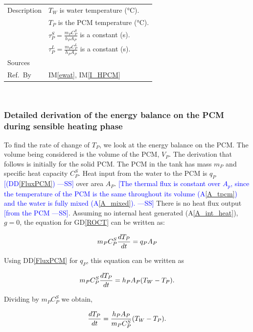 \documentclass[12pt]{article}
\newcommand{\authornote}[3]{\textcolor{#1}{[#3 ---#2]}}
\newcommand{\authornote}[3]{}
\newcommand{\wss}[1]{\authornote{blue}{SS}{#1}}
\newcommand{\colAwidth}{0.13\textwidth}
\newcommand{\colBwidth}{0.82\textwidth}
\newcommand{\dref}[1]{GD\ref{#1}}
\newcommand{\ddref}[1]{DD\ref{#1}}
\newcommand{\aref}[1]{A\ref{#1}}
\newcommand{\iref}[1]{IM\ref{#1}}
\begin{document}
\begin{minipage}{\textwidth}
\begin{tabular}{| p{\colAwidth} | p{\colBwidth}|}
  \hline
  Description&$T_W$ is water temperature (\si{\celsius}).\\
  &$T_P$ is the PCM temperature (\si{\celsius}).\\
  &$\tau^S_P = \frac{m_P C^S_P}{h_P A_P}$ is a constant
  (\si{\second}).\\
  &$\tau^L_P = \frac{m_P C^L_P}{h_P A_P}$ is a constant
  (\si{\second}).
  \\
  \hline
  Sources&~\cite{Lightstone2012}\ \\
  \hline
  Ref.\ By & \iref{ewat}, \iref{I_HPCM}\\
  \hline
\end{tabular}
\end{minipage}\\

\subsubsection*{Detailed derivation of the energy balance on the PCM during sensible heating phase}

To find the rate of change of $T_P$, we look at the energy balance on the PCM.
The volume being considered is the volume of the PCM, $V_P$.  The derivation
that follows is initially for the solid PCM.  The PCM in the tank has mass $m_P$
and specific heat capacity $C^S_P$.  Heat input from the water to the PCM is
$q_P$ \wss{(\ddref{FluxPCM})} over area $A_P$.  \wss{The thermal flux is constant
  over $A_p$, since the temperature of the PCM is the same throughout its
  volume (\aref{A_tpcm}) and the water is fully mixed (\aref{A_mixed}).}  There is
no heat flux output \wss{from the PCM}.  Assuming no internal heat generated
(\aref{A_int_heat}), $g=0$, the equation for \dref{ROCT} can be written as:

\begin{equation*}
\\m_P C_P^S \frac{d T_P}{dt} = q_P A_P
\end{equation*}

\noindent
Using \ddref{FluxPCM} for $q_P$, this equation can be written as

\begin{equation*}
\\m_P C^S_P \frac{dT_P}{dt} = h_P A_P (T_W - T_P).
\end{equation*}

\noindent
Dividing by $m_P C^S_P$ we obtain,

\begin{equation*}
\\\frac{dT_P}{dt} = \frac{h_P A_P}{m_P C^S_P} (T_W - T_P).
\end{equation*}
\end{document}
